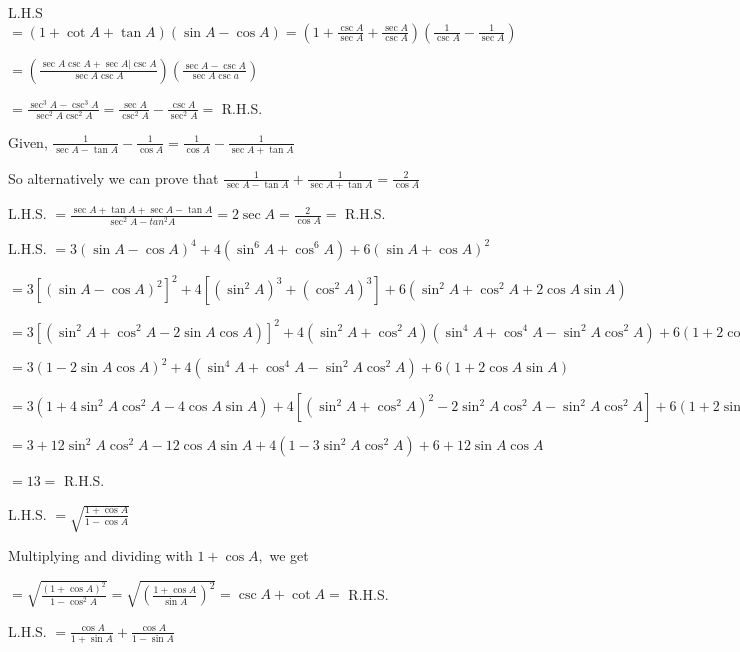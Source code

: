 \item L.H.S $= (1 + \cot A + \tan A)(\sin A - \cos A) = \left(1 + \frac{\csc A}{\sec A} + \frac{\sec A}{\csc
    A}\right)\left(\frac{1}{\csc A} - \frac{1}{\sec A}\right)$

    $= \left(\frac{\sec A\csc A + \sec A | \csc A}{\sec A\csc A}\right)\left(\frac{\sec A - \csc A}{\sec A\csc
    a}\right)$

    $= \frac{\sec^3A - \csc^3A}{\sec^2A\csc^2A} = \frac{\sec A}{\csc^2A} - \frac{\csc A}{\sec^2A} =$ R.H.S.

\item Given, $\frac{1}{\sec A - \tan A} - \frac{1}{\cos A} = \frac{1}{\cos A} - \frac{1}{\sec A + \tan A}$

    So alternatively we can prove that $\frac{1}{\sec A - \tan A} + \frac{1}{\sec A + \tan A} = \frac{2}{\cos A}$

    L.H.S. $= \frac{\sec A + \tan A + \sec A - \tan A}{\sec^2A - tan^2A} = 2\sec A = \frac{2}{\cos A} =$ R.H.S.

\item L.H.S. $= 3(\sin A - \cos A)^4 + 4(\sin^6 A + \cos^6 A) + 6(\sin A + \cos A)^2$

    $= 3[(\sin A - \cos A)^2]^2 + 4[(\sin^2A)^3 + (\cos^2A)^3] + 6(\sin^2A + \cos^2A + 2\cos A\sin A)$

    $= 3[(\sin^2A + \cos^2A - 2\sin A\cos A)]^2 + 4(\sin^2A + \cos^2A)(\sin^4A + \cos^4A - \sin^2A\cos^2A) + 6(1 + 2\cos A\sin
    A)$

    $= 3(1 - 2\sin A\cos A)^2 + 4(\sin^4A + \cos^4A - \sin^2A\cos^2A) + 6(1 + 2\cos A\sin A)$

    $= 3(1 + 4\sin^2A\cos^2A - 4\cos A\sin A) + 4[(\sin^2A + \cos^2A)^2 - 2\sin^2A\cos^2A - \sin^2A\cos^2A] + 6(1 + 2\sin
    A\cos A)$

    $= 3 + 12\sin^2A\cos^2A -12\cos A\sin A + 4(1 - 3\sin^2A\cos^2A) + 6 + 12\sin A\cos A$

    $= 13 =$ R.H.S.

\item L.H.S. $= \sqrt{\frac{1 + \cos A}{1 - \cos A}}$

    Multiplying and dividing with $1 + \cos A,$ we get

    $= \sqrt{\frac{(1 + \cos A)^2}{1 - \cos^2A}} = \sqrt{\left(\frac{1 + \cos A}{\sin A}\right)^2} = \csc A + \cot A =$
    R.H.S.

\item L.H.S. $= \frac{\cos A}{1 + \sin A} + \frac{\cos A}{1 - \sin A}$

